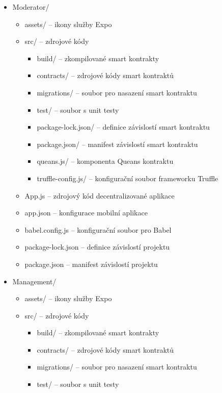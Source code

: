 \begin{itemize}
\begin{itemize}
    \end{itemize}
    \item Moderator/
    \begin{itemize}
        \item assets/ -- ikony služby Expo 
        \item src/ -- zdrojové kódy 
        \begin{itemize}
            \item build/ -- zkompilované smart kontrakty 
            \item contracts/ -- zdrojové kódy smart kontraktů
            \item migrations/ -- soubor pro nasazení smart kontraktu
            \item test/ -- soubor s unit testy
            \item package-lock.json/ -- definice závislostí smart kontraktu
            \item package.json/ -- manifest závislostí smart kontraktu
            \item queans.js/ -- komponenta Queans kontraktu
            \item truffle-config.js/ -- konfigurační soubor frameworku Truffle
        \end{itemize}
        \item App.js -- zdrojový kód decentralizované aplikace
        \item app.json -- konfigurace mobilní aplikace
        \item babel.config.js -- konfigurační soubor pro Babel
        \item package-lock.json -- definice závislostí projektu
        \item package.json -- manifest závislostí projektu
    \end{itemize}
    \item Management/
    \begin{itemize}
        \item assets/ -- ikony služby Expo 
        \item src/ -- zdrojové kódy 
        \begin{itemize}
            \item build/ -- zkompilované smart kontrakty 
            \item contracts/ -- zdrojové kódy smart kontraktů
            \item migrations/ -- soubor pro nasazení smart kontraktu
            \item test/ -- soubor s unit testy

\end{itemize}
\end{itemize}
\end{itemize}
